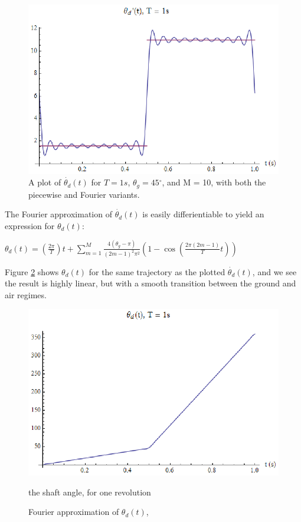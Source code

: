 \documentclass[11pt]{article}
\begin{document}
\begin{figure}[H]
\centering
\includegraphics{report_gr7.eps}
\caption{A plot of \(\dot{\theta _d}(t)\) for \(T=1s\), \(\theta _g=45{}^{\circ}\), and M = 10, with both the piecewise and Fourier variants.}
\label{fig:piecewise}
\end{figure}

The Fourier approximation of \(\dot{\theta _d}(t)\) is easily differientiable to yield an expression for \(\theta _d(t)\):

\begin{center}
\(\theta _d(t)=\left(\frac{2 \pi }{T}\right)t+\sum _{m=1}^M \frac{4\left(\theta _g-\pi \right)}{(2m-1)^2\pi ^2}\left(1-\cos \left(\frac{2\pi  (2m-1)}{T}t\right)\right)\)
\end{center}

Figure \ref{fig:angleposition} shows \(\theta _d(t)\) for the same trajectory as the plotted \(\dot{\theta _d}(t)\), and we see the result is highly linear, but with a smooth transition between the ground and air regimes.

\begin{figure}[H]
\centering
\includegraphics{report_gr8.eps}
\caption{Fourier approximation of \(\theta _d(t)\),} the shaft angle, for one revolution
\label{fig:angleposition}
\end{figure}
\end{document}
